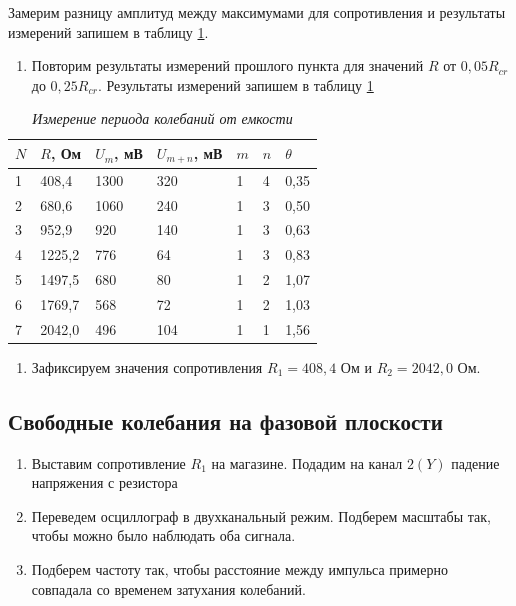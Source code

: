 \documentclass[a4paper,12pt]{article}
\begin{document}
Замерим разницу амплитуд между максимумами для сопротивления и результаты измерений запишем в таблицу \ref{table:2}.

\begin{enumerate}[resume]
    \item Повторим результаты измерений прошлого пункта для значений $R$ от $0,05 R_{cr}$ до $0,25 R_{cr}$. Результаты измерений запишем в таблицу \ref{table:2}
\end{enumerate}

\begin{table}[!ht]
    \centering
    \begin{tabular}{|l|l|l|l|l|l|l|}
    \hline
        $N$ & $R$, Ом & $U_m$, мВ & $U_{m+n}$, мВ & $m$ & $n$ & $\theta$ \\ \hline
        1 & 408,4 & 1300 & 320 & 1 & 4 & 0,35 \\ \hline
        2 & 680,6 & 1060 & 240 & 1 & 3 & 0,50 \\ \hline
        3 & 952,9 & 920 & 140 & 1 & 3 & 0,63 \\ \hline
        4 & 1225,2 & 776 & 64 & 1 & 3 & 0,83 \\ \hline
        5 & 1497,5 & 680 & 80 & 1 & 2 & 1,07 \\ \hline
        6 & 1769,7 & 568 & 72 & 1 & 2 & 1,03 \\ \hline
        7 & 2042,0 & 496 & 104 & 1 & 1 & 1,56 \\ \hline
    \end{tabular}\caption{\textit{Измерение периода колебаний от емкости}}\label{table:2}
\end{table}

\FloatBarrier

\begin{enumerate}[resume]
    \item Зафиксируем значения сопротивления $R_1 = 408,4$ Ом и $R_2 = 2042,0$ Ом.
\end{enumerate}

\subsection{Свободные колебания на фазовой плоскости}

\begin{enumerate}
    \item Выставим сопротивление $R_1$ на магазине. Подадим на канал $2(Y)$ падение напряжения с резистора
    \item Переведем осциллограф в двухканальный режим. Подберем масштабы так, чтобы можно было наблюдать оба сигнала.
    \item Подберем частоту так, чтобы расстояние между импульса примерно совпадала со временем затухания колебаний.
\end{enumerate}
\end{document}
